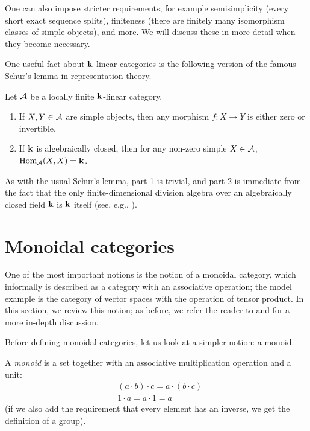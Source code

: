 One can also impose stricter requirements, for example semisimplicity (every
short exact sequence splits), finiteness (there are finitely many isomorphism
classes of simple objects), and more. We will discuss these in more detail when
they become necessary.

One useful fact about $\mathbf{k}$-linear categories is the following version of the
famous Schur's lemma in representation theory.

\begin{lemma}\label{l:schur}
  Let $\mathcal{A}$ be a locally finite $\mathbf{k}$-linear category.
  \begin{enumerate}
    \item If $X,Y\in \mathcal{A}$ are simple objects, then any morphism
      $f\colon X\to Y$ is either zero or invertible.
    \item If $\mathbf{k}$ is algebraically closed, then for any non-zero
      simple $X\in \mathcal{A}$, $\operatorname{Hom}_{\mathcal{A}}(X,X)=\mathbf{k}$.
  \end{enumerate}
\end{lemma}
As with the usual Schur's lemma, part 1 is trivial, and part 2 is immediate
from the fact that the only finite-dimensional division algebra over an
algebraically closed field $\mathbf{k}$ is $\mathbf{k}$ itself (see, e.g.,
\cite[Lemma 3.5]{pierce}).

\section{Monoidal categories}\label{s:monoidal}
One of the most important notions is the notion of a monoidal category, which
informally is described as a category with an associative operation; the model
example is the category of vector spaces with the operation of tensor product.
In this section, we review this notion; as before, we refer the reader to
\cite[Chapter 2]{etingof-fusion} and \cite[Section 1.2]{leinster} for a more
in-depth discussion.

Before defining monoidal categories, let us look at a simpler notion: a monoid.

A \emph{monoid} is a set together with an associative
multiplication operation and a unit:
\begin{align*}
  &(a\cdot b)\cdot c = a\cdot (b\cdot c)\\
  &1\cdot a = a\cdot 1 = a
\end{align*}
(if we also add the requirement that every element has an inverse,
we get the definition of a group).

